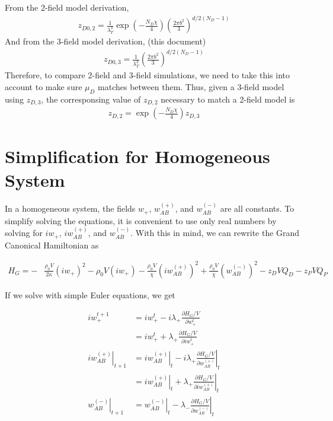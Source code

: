 \documentclass{article}
\begin{document}
From the 2-field model derivation,
\begin{align*}
  z_{D0,2} = \frac{1}{\lambda_T^3}
  \exp \left( -\frac{N_D\chi}{4}  \right)
  \left( \frac{2\pi b^2}{3} \right)^{d/2(N_D-1)} 
\end{align*}
And from the 3-field model derivation, (this document)
\begin{align*}
  z_{D0,3} = \frac{1}{\lambda_T^3}
  \left( \frac{2\pi b^2}{3} \right)^{d/2(N_D-1)} 
\end{align*}
Therefore, to compare 2-field and 3-field simulations, we need to take this
  into account to make sure $\mu_D$ matches between them.
Thus, given a 3-field model using $z_{D,3}$, the corresponsing value of
  $z_{D,2}$ necessary to match a 2-field model is
\begin{align*}
  z_{D,2} = \exp \left( -\frac{N_D\chi}{4}  \right) z_{D,3}
\end{align*}

\section{Simplification for Homogeneous System}

In a homogeneous system, the fields $w_+$, $w_{AB}^{(+)}$, and $w_{AB}^{(-)}$
  are all constants.
To simplify solving the equations, it is convenient to use only real numbers by
  solving for $iw_+$, $iw_{AB}^{(+)}$, and $w_{AB}^{(-)}$.
With this in mind, we can rewrite the Grand Canonical Hamiltonian as

\begin{align*}
  H_G = - &\frac{\rho_0 V}{2\kappa} (i w_+)^2
        - \rho_0 V (i w_+)
        - \frac{\rho_0 V}{\chi} (i w_{AB}^{(+)})^2
        + \frac{\rho_0 V}{\chi} (w_{AB}^{(-)})^2
        - z_D V Q_D
        - z_P V Q_P
\end{align*}

If we solve with simple Euler equations, we get

\begin{align*}
  iw_+^{t+1} &= iw_+^t - i\lambda_+ \frac{\partial H_G/V}{\partial w_+^t} \\
    &= iw_+^t + \lambda_+ \frac{\partial H_G/V}{\partial iw_+^t} \\
  \left. iw_{AB}^{(+)} \right|_{t+1} &= \left. iw_{AB}^{(+)} \right|_t
    - i\lambda_+ \left. \frac{\partial H_G/V}{\partial w_{AB}^{(+)}} \right|_t \\
    &= \left. iw_{AB}^{(+)} \right|_t
    + \lambda_+ \left. \frac{\partial H_G/V}{\partial iw_{AB}^{(+)}} \right|_t \\
  \left. w_{AB}^{(-)} \right|_{t+1} &= \left. w_{AB}^{(-)} \right|_t
    - \lambda_- \left. \frac{\partial H_G/V}{\partial w_{AB}^{(-)}} \right|_t
\end{align*}
\end{document}
